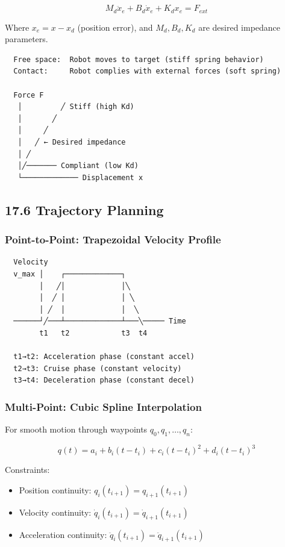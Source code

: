 \documentclass[11pt,a4paper]{book}
\begin{document}
\begin{itemize}
\[M_d \ddot{x}_e + B_d \dot{x}_e + K_d x_e = F_{ext}\]

Where $x_e = x - x_d$ (position error), and $M_d, B_d, K_d$ are desired impedance parameters.

\begin{lstlisting}
  Free space:  Robot moves to target (stiff spring behavior)
  Contact:     Robot complies with external forces (soft spring)
  
  Force F
   │         ╱ Stiff (high Kd)
   │       ╱
   │     ╱
   │   ╱ ← Desired impedance
   │ ╱
   │╱─────── Compliant (low Kd)
   └───────────── Displacement x
\end{lstlisting}

\medskip\noindent\hrulefill\medskip

\subsection{17.6 Trajectory Planning}

\subsubsection{Point-to-Point: Trapezoidal Velocity Profile}

\begin{lstlisting}
  Velocity
  v_max │    ┌─────────────┐
        │   ╱│             │╲
        │  ╱ │             │ ╲
        │ ╱  │             │  ╲
  ──────┘╱───┴─────────────┴───╲───── Time
        t1   t2            t3  t4
        
  t1→t2: Acceleration phase (constant accel)
  t2→t3: Cruise phase (constant velocity)
  t3→t4: Deceleration phase (constant decel)
\end{lstlisting}

\subsubsection{Multi-Point: Cubic Spline Interpolation}

For smooth motion through waypoints $q_0, q_1, \ldots, q_n$:

\[q(t) = a_i + b_i(t - t_i) + c_i(t - t_i)^2 + d_i(t - t_i)^3\]

Constraints:
\begin{itemize}
\item Position continuity: $q_i(t_{i+1}) = q_{i+1}(t_{i+1})$
\item Velocity continuity: $\dot{q}_i(t_{i+1}) = \dot{q}_{i+1}(t_{i+1})$
\item Acceleration continuity: $\ddot{q}_i(t_{i+1}) = \ddot{q}_{i+1}(t_{i+1})$
\end{itemize}


\end{itemize}
\end{document}
